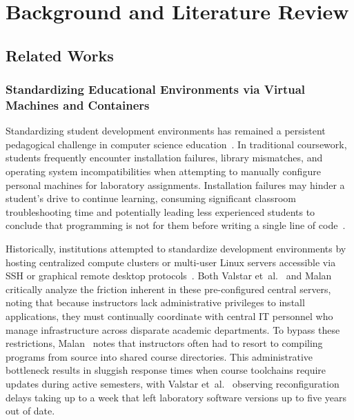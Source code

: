 \chapter{Background and Literature Review}
\label{chap:litreview}

\section{Related Works}
\label{sec:related-work}

\subsection{Standardizing Educational Environments via Virtual Machines and
Containers}

Standardizing student development environments has remained a persistent
pedagogical challenge in computer science education~\cite{stokerUsingVirtualMachines2013,harvieUsingVirtualMachines2019}.
In traditional coursework, students frequently encounter installation failures, library
mismatches, and operating system incompatibilities when attempting to manually
configure personal machines for laboratory assignments. Installation failures may
hinder a student's drive to continue learning, consuming significant classroom
troubleshooting time and potentially leading less experienced students to
conclude that programming is not for them before writing a single line of code~\cite{harvieUsingVirtualMachines2019,malanContainerizingCS50Standardizing2024}.

Historically, institutions attempted to standardize development environments by hosting
centralized compute clusters or multi-user Linux servers accessible via SSH or graphical
remote desktop protocols~\cite{malanContainerizingCS50Standardizing2024}. Both
Valstar et~al.~\cite{valstarUsingDevContainersStandardize2020} and Malan~\cite{malanContainerizingCS50Standardizing2024}
critically analyze the friction inherent in these pre-configured central servers,
noting that because instructors lack administrative privileges to install
applications, they must continually coordinate with central IT personnel who manage
infrastructure across disparate academic departments. To bypass these
restrictions, Malan~\cite{malanContainerizingCS50Standardizing2024} notes that instructors
often had to resort to compiling programs from source into shared course directories.
This administrative bottleneck results in sluggish response times when course
toolchains require updates during active semesters, with Valstar et~al.~\cite{valstarUsingDevContainersStandardize2020}
observing reconfiguration delays taking up to a week that left laboratory
software versions up to five years out of date.

